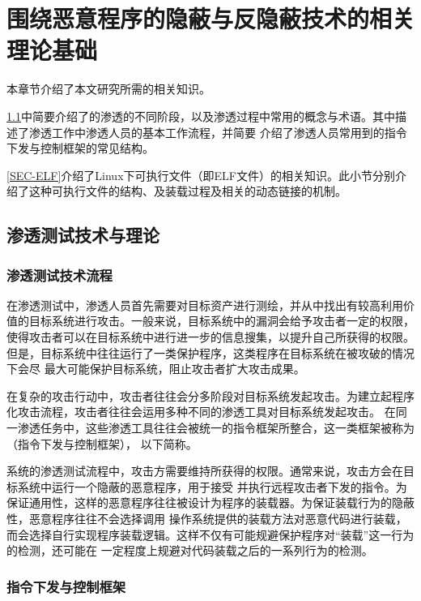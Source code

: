 \chapter{围绕恶意程序的隐蔽与反隐蔽技术的相关理论基础}

本章节介绍了本文研究所需的相关知识。

\ref{SEC-PENTEST-STD}中简要介绍了的渗透的不同阶段，以及渗透过程中常用的概念与术语。其中描述了渗透工作中渗透人员的基本工作流程，并简要
介绍了渗透人员常用到的指令下发与控制框架的常见结构。

\ref{SEC-ELF}介绍了Linux下可执行文件（即ELF文件）的相关知识。此小节分别介绍了这种可执行文件的结构、及装载过程及相关的动态链接的机制。

\section{渗透测试技术与理论}
\label{SEC-PENTEST-STD}

\subsection{渗透测试技术流程}

在渗透测试中，渗透人员首先需要对目标资产进行测绘，并从中找出有较高利用价值的目标系统进行攻击。一般来说，目标系统中的漏洞会给予攻击者一定的权限，
使得攻击者可以在目标系统中进行进一步的信息搜集，以提升自己所获得的权限。但是，目标系统中往往运行了一类保护程序，这类程序在目标系统在被攻破的情况下会尽
最大可能保护目标系统，阻止攻击者扩大攻击成果。

在复杂的攻击行动中，攻击者往往会分多阶段对目标系统发起攻击。为建立起程序化攻击流程，攻击者往往会运用多种不同的渗透工具对目标系统发起攻击。
在同一渗透任务中，这些渗透工具往往会被统一的指令框架所整合，这一类框架被称为（指令下发与控制框架），
以下简称。

系统的渗透测试流程中，攻击方需要维持所获得的权限。通常来说，攻击方会在目标系统中运行一个隐蔽的恶意程序，用于接受
并执行远程攻击者下发的指令。为保证通用性，这样的恶意程序往往被设计为程序的装载器。为保证装载行为的隐蔽性，恶意程序往往不会选择调用
操作系统提供的装载方法对恶意代码进行装载，而会选择自行实现程序装载逻辑。这样不仅有可能规避保护程序对“装载”这一行为的检测，还可能在
一定程度上规避对代码装载之后的一系列行为的检测。

\subsection{指令下发与控制框架}

